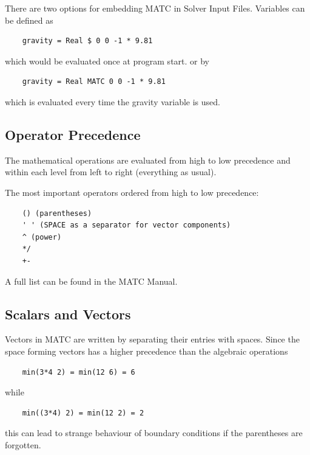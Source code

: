 There are two options for embedding MATC in Solver Input Files. Variables can be defined as

\begin{verbatim}
    gravity = Real $ 0 0 -1 * 9.81
\end{verbatim}

\noindent which would be evaluated once at program start. or by

\begin{verbatim}
    gravity = Real MATC 0 0 -1 * 9.81
\end{verbatim}

\noindent which is evaluated every time the gravity variable is used.

\subsection{Operator Precedence}

The mathematical operations are evaluated from high to low precedence and within each level from left to right (everything as usual).

\noindent The most important operators ordered from high to low precedence:

\begin{verbatim}
    () (parentheses)
    ' ' (SPACE as a separator for vector components)
    ^ (power)
    */ 
    +- 
\end{verbatim}

\noindent A full list can be found in the MATC Manual.

\subsection{Scalars and Vectors}

Vectors in MATC are written by separating their entries with spaces. Since the space forming vectors has a higher precedence than the algebraic operations

\begin{verbatim}
    min(3*4 2) = min(12 6) = 6
\end{verbatim}

\noindent while

\begin{verbatim}
    min((3*4) 2) = min(12 2) = 2
\end{verbatim}

\noindent this can lead to strange behaviour of boundary conditions if the parentheses are forgotten. 

